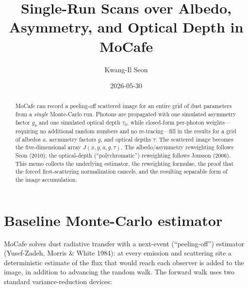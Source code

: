 \documentclass[english,a4paper]{kiseon_memo}
\begin{document}
\title{Single-Run Scans over Albedo, Asymmetry, and Optical Depth in MoCafe}
\author{Kwang-Il Seon}
\date{2026-05-30}
\maketitle

\begin{abstract}
\noindent
MoCafe can record a peeling-off scattered image for an entire grid of dust
parameters from a \emph{single} Monte-Carlo run.  Photons are propagated with one
simulated asymmetry factor $g_0$ and one simulated optical depth $\tau_0$, while
closed-form per-photon weights---requiring no additional random numbers and no
re-tracing---fill in the results for a grid of albedos $a$, asymmetry factors
$g$, and optical depths $\tau$.  The scattered image becomes the five-dimensional
array $J(x,y,a,g,\tau)$.  The albedo/asymmetry reweighting follows
Seon (2010); the optical-depth (``polychromatic'') reweighting follows
Jonsson (2006).  This memo collects the underlying estimator, the reweighting
formulae, the proof that the forced first-scattering normalization cancels, and
the resulting separable form of the image accumulation.
\end{abstract}

\tableofcontents
\bigskip

\section{Baseline Monte-Carlo estimator}

MoCafe solves dust radiative transfer with a next-event (``peeling-off'')
estimator (Yusef-Zadeh, Morris \& White 1984): at every emission and scattering
site a deterministic estimate of the flux that would reach each observer is
added to the image, in addition to advancing the random walk.  The forward walk
uses two standard variance-reduction devices:
\end{document}

